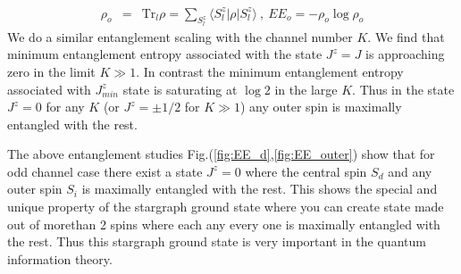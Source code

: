 \documentclass[reprint,prb,superscriptaddress]{revtex4-2}
\begin{document}
\begin{eqnarray}
\rho_{o} &=& \textrm{Tr}_{l} \rho =\displaystyle\sum_{S^z_{l}} \langle S^z_l | \rho | S^z_{l} \rangle~,~EE_o=-\rho_{o}\log \rho_{o}
\end{eqnarray}
We do a similar entanglement scaling with the channel number $K$. We find that minimum entanglement entropy associated with the state $J^z=J$ is approaching zero in the limit $K\gg 1$. In contrast the minimum entanglement entropy associated with $J^z_{min}$ state is saturating at $\log 2$ in the large $K$. Thus in the state $J^z=0$ for any $K$ (or $J^z=\pm 1/2$ for $K\gg 1$) any outer spin is maximally entangled with the rest.

\par The above entanglement studies Fig.(\ref{fig:EE_d},\ref{fig:EE_outer}) show  that for odd channel case there exist a state $J^z=0$ where the central spin $S_d$ and any outer spin $S_i$ is maximally entangled with the rest. This shows the special and unique property of the stargraph ground state where you can create state made out of morethan 2 spins where each any every one is maximally entangled with the rest. Thus this stargraph ground state is very important in the quantum information theory. 
\end{document}
